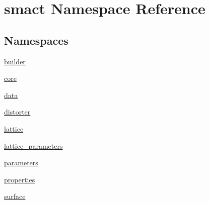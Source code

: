 \hypertarget{namespacesmact}{}\section{smact Namespace Reference}
\label{namespacesmact}
\subsection*{Namespaces}
\begin{DoxyCompactItemize}
\item 
 \hyperlink{namespacesmact_1_1builder}{builder}
\item 
 \hyperlink{namespacesmact_1_1core}{core}
\item 
 \hyperlink{namespacesmact_1_1data}{data}
\item 
 \hyperlink{namespacesmact_1_1distorter}{distorter}
\item 
 \hyperlink{namespacesmact_1_1lattice}{lattice}
\item 
 \hyperlink{namespacesmact_1_1lattice__parameters}{lattice\+\_\+parameters}
\item 
 \hyperlink{namespacesmact_1_1parameters}{parameters}
\item 
 \hyperlink{namespacesmact_1_1properties}{properties}
\item 
 \hyperlink{namespacesmact_1_1surface}{surface}
\end{DoxyCompactItemize}
